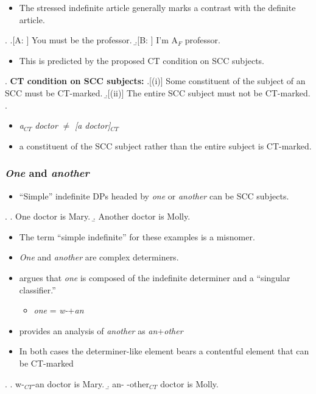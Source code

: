 \documentclass[letterpaper]{article}
\begin{document}
\begin{itemize}
  \item The stressed indefinite article generally marks a contrast with the definite article.
\end{itemize}
\ex.
\a.[A: ] You must be the professor.
\b.[B: ] I'm A$_F$ professor.

\begin{itemize}
  \item This is predicted by the proposed CT condition on SCC subjects.
\end{itemize}
\ex. \textbf{CT condition on SCC subjects:}
\a.[(i)] Some constituent of the subject of an SCC must be CT-marked.
\b.[(ii)] The entire SCC subject must not be CT-marked.
\z.

\begin{itemize}
  \item \textit{a}$_{CT}$\textit{ doctor} $\neq$ \textit{[a doctor]}$_{CT}$
  \item a constituent of the SCC subject rather than the entire subject is CT-marked.
\end{itemize}
\subsubsection{\textit{One} and \textit{another}}
\begin{itemize}
  \item ``Simple'' indefinite DPs headed by \textit{one} or \textit{another} can be SCC subjects.
\end{itemize}
\ex. 
\a. One doctor is Mary.
\b. Another doctor is Molly.

\begin{itemize}
  \item The term ``simple indefinite'' for these examples is a misnomer.
  \item \textit{One} and \textit{another} are complex determiners.
  \item \textcite{kayne2015one} argues that \textit{one} is composed of the indefinite determiner and a ``singular classifier.''
    \begin{itemize}
      \item \textit{one} = \textit{w-}+\textit{an}
    \end{itemize}
  \item \textcite{heim1991reciprocity} provides an analysis of \textit{another} as \textit{an}+\textit{other}
  \item In both cases the determiner-like element bears a contentful element that can be CT-marked
\end{itemize}
\ex.
\a. w-$_{CT}$-an doctor is Mary.
\b. an- -other$_{CT}$ doctor is Molly.
\end{document}
